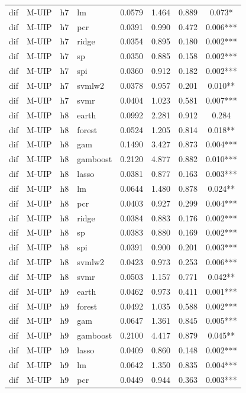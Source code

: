\begin{ThreePartTable}
\begin{longtable}[t]{llclcccc}
dif & M-UIP & h7 & lm & 0.0579 & 1.464 & 0.889 & 0.073*\\
dif & M-UIP & h7 & pcr & 0.0391 & 0.990 & 0.472 & 0.006***\\
dif & M-UIP & h7 & ridge & 0.0354 & 0.895 & 0.180 & 0.002***\\
dif & M-UIP & h7 & sp & 0.0350 & 0.885 & 0.158 & 0.002***\\
dif & M-UIP & h7 & spi & 0.0360 & 0.912 & 0.182 & 0.002***\\
dif & M-UIP & h7 & svmlw2 & 0.0378 & 0.957 & 0.201 & 0.010**\\
dif & M-UIP & h7 & svmr & 0.0404 & 1.023 & 0.581 & 0.007***\\
\addlinespace
dif & M-UIP & h8 & earth & 0.0992 & 2.281 & 0.912 & 0.284\\
dif & M-UIP & h8 & forest & 0.0524 & 1.205 & 0.814 & 0.018**\\
dif & M-UIP & h8 & gam & 0.1490 & 3.427 & 0.873 & 0.004***\\
dif & M-UIP & h8 & gamboost & 0.2120 & 4.877 & 0.882 & 0.010***\\
dif & M-UIP & h8 & lasso & 0.0381 & 0.877 & 0.163 & 0.003***\\
dif & M-UIP & h8 & lm & 0.0644 & 1.480 & 0.878 & 0.024**\\
dif & M-UIP & h8 & pcr & 0.0403 & 0.927 & 0.299 & 0.004***\\
dif & M-UIP & h8 & ridge & 0.0384 & 0.883 & 0.176 & 0.002***\\
dif & M-UIP & h8 & sp & 0.0383 & 0.880 & 0.169 & 0.002***\\
dif & M-UIP & h8 & spi & 0.0391 & 0.900 & 0.201 & 0.003***\\
dif & M-UIP & h8 & svmlw2 & 0.0423 & 0.973 & 0.253 & 0.006***\\
dif & M-UIP & h8 & svmr & 0.0503 & 1.157 & 0.771 & 0.042**\\
\addlinespace
dif & M-UIP & h9 & earth & 0.0462 & 0.973 & 0.411 & 0.001***\\
dif & M-UIP & h9 & forest & 0.0492 & 1.035 & 0.588 & 0.002***\\
dif & M-UIP & h9 & gam & 0.0647 & 1.361 & 0.845 & 0.005***\\
dif & M-UIP & h9 & gamboost & 0.2100 & 4.417 & 0.879 & 0.045**\\
dif & M-UIP & h9 & lasso & 0.0409 & 0.860 & 0.148 & 0.002***\\
dif & M-UIP & h9 & lm & 0.0642 & 1.350 & 0.835 & 0.004***\\
dif & M-UIP & h9 & pcr & 0.0449 & 0.944 & 0.363 & 0.003***\\

\end{longtable}
\end{ThreePartTable}
